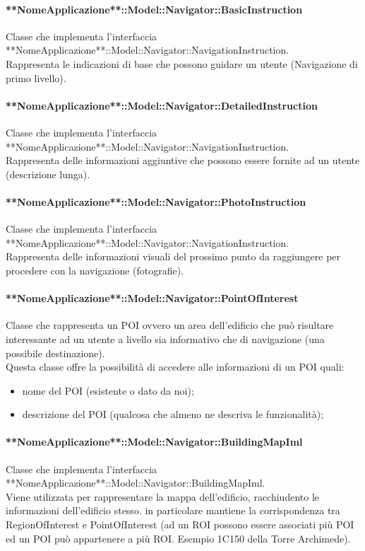 \documentclass[../SpecificaTecnica.tex]{subfiles}
\begin{document}
				\paragraph{**NomeApplicazione**::Model::Navigator::BasicInstruction}
					Classe che implementa l'interfaccia **NomeApplicazione**::Model::Navigator::NavigationInstruction. \\
					Rappresenta le indicazioni di base che possono guidare un utente (Navigazione di primo livello).
				\paragraph{**NomeApplicazione**::Model::Navigator::DetailedInstruction}
					Classe che implementa l'interfaccia **NomeApplicazione**::Model::Navigator::NavigationInstruction. \\
					Rappresenta delle informazioni aggiuntive che possono essere fornite ad un utente (descrizione lunga).
				\paragraph{**NomeApplicazione**::Model::Navigator::PhotoInstruction}
					Classe che implementa l'interfaccia **NomeApplicazione**::Model::Navigator::NavigationInstruction. \\
					Rappresenta delle informazioni visuali del prossimo punto da raggiungere per procedere con la navigazione (fotografie).
				\paragraph{**NomeApplicazione**::Model::Navigator::PointOfInterest}
					Classe che rappresenta un POI ovvero un area dell'edificio che può risultare interessante ad un utente a livello sia informativo che di navigazione (una possibile destinazione). \\
					Questa classe offre la possibilità di accedere alle informazioni di un POI quali:
					\begin{itemize}
						\item nome del POI (esistente o dato da noi);
						\item descrizione del POI (qualcosa che almeno ne descriva le funzionalità);
					\end{itemize}
				\paragraph{**NomeApplicazione**::Model::Navigator::BuildingMapIml}
					Classe che implementa l'interfaccia **NomeApplicazione**::Model::Navigator::BuildingMapIml. \\
					Viene utilizzata per rappresentare la mappa dell'edificio, racchiudento le informazioni dell'edificio stesso. in particolare mantiene la corrispondenza tra RegionOfInterest e PointOfInterest (ad un ROI possono essere associati più POI ed un POI può appartenere a più ROI. Esempio 1C150 della Torre Archimede). 
\end{document}
